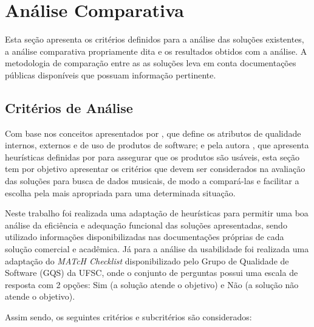 \chapter{Análise Comparativa} \label{cap:analiseResultados}
Esta seção apresenta os critérios definidos para a análise das soluções existentes, a análise comparativa propriamente dita e os resultados obtidos com a análise. A metodologia de comparação entre as as soluções leva em conta documentações públicas disponíveis que possuam informação pertinente.

\section{Critérios de Análise} \label{sec:criterios-analise}

Com base nos conceitos apresentados por , que define os atributos de qualidade internos, externos e de uso de produtos de software; e pela autora , que apresenta heurísticas definidas por  para assegurar que os produtos são usáveis, esta seção tem por objetivo apresentar os critérios que devem ser considerados na avaliação das soluções para busca de dados musicais, de modo a compará-las e facilitar a escolha pela mais apropriada para uma determinada situação.

Neste trabalho foi realizada uma adaptação de heurísticas para permitir uma boa análise da eficiência e adequação funcional das soluções apresentadas, sendo utilizado informações disponibilizadas nas documentações próprias de cada solução comercial e acadêmica. Já para a análise da usabilidade foi realizada uma adaptação do \textit{MATcH Checklist} disponibilizado pelo Grupo de Qualidade de Software (GQS) da UFSC, onde o conjunto de perguntas possui uma escala de resposta com 2 opções: Sim (a solução atende o objetivo) e Não (a solução não atende o objetivo).

Assim sendo, os seguintes critérios e subcritérios são considerados:

